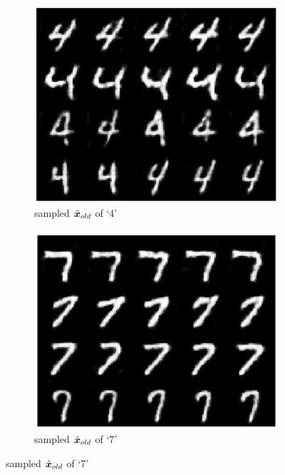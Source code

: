 \documentclass[../../book-main.tex]{subfiles}
\begin{document}
\begin{figure}[t]
    \begin{subfigure}[t]{0.20\textwidth}
        \centering
        \includegraphics[width=\textwidth]{chapters/chapter5/figs/mnist_4.png}
        \caption{sampled $\hat{\bm{x}}_{old}$ of `4'}
    \end{subfigure}
    \hfill
    \begin{subfigure}[t]{0.20\textwidth}
        \centering
        \includegraphics[width=\textwidth]{chapters/chapter5/figs/mnist_7.png}
        \caption{sampled $\hat{\bm{x}}_{old}$ of `7'}
    \end{subfigure}

\end{figure}
\end{document}
